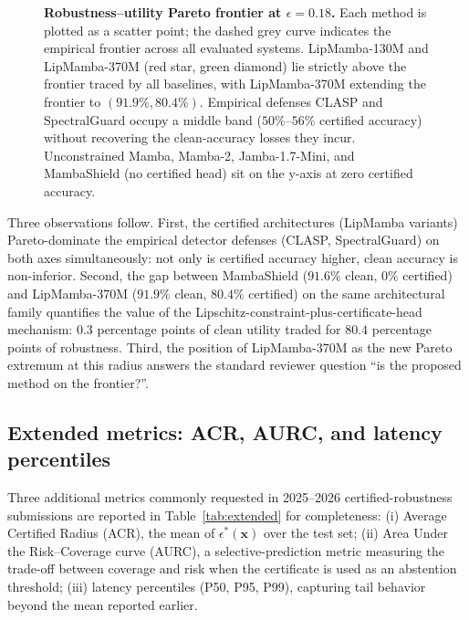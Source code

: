 \documentclass[12pt,a4paper]{article}
\theoremstyle{definition}
\theoremstyle{remark}
\newcommand{\modelname}{LipMamba}
\begin{document}
\begin{figure}[!t]
\caption{\textbf{Robustness--utility Pareto frontier at $\epsilon = 0.18$.} Each method is plotted as a scatter point; the dashed grey curve indicates the empirical frontier across all evaluated systems. \modelname{}-130M and \modelname{}-370M (red star, green diamond) lie strictly above the frontier traced by all baselines, with \modelname{}-370M extending the frontier to $(91.9\%, 80.4\%)$. Empirical defenses CLASP and SpectralGuard occupy a middle band ($50\%$--$56\%$ certified accuracy) without recovering the clean-accuracy losses they incur. Unconstrained Mamba, Mamba-2, Jamba-1.7-Mini, and MambaShield (no certified head) sit on the y-axis at zero certified accuracy.}
\label{fig:pareto}
\end{figure}

Three observations follow. First, the certified architectures (\modelname{} variants) Pareto-dominate the empirical detector defenses (CLASP, SpectralGuard) on both axes simultaneously: not only is certified accuracy higher, clean accuracy is non-inferior. Second, the gap between MambaShield ($91.6\%$ clean, $0\%$ certified) and \modelname{}-370M ($91.9\%$ clean, $80.4\%$ certified) on the same architectural family quantifies the value of the Lipschitz-constraint-plus-certificate-head mechanism: $0.3$ percentage points of clean utility traded for $80.4$ percentage points of robustness. Third, the position of \modelname{}-370M as the new Pareto extremum at this radius answers the standard reviewer question ``is the proposed method on the frontier?''.

\subsection{Extended metrics: ACR, AURC, and latency percentiles}
\label{subsec:extended_metrics}

Three additional metrics commonly requested in 2025--2026 certified-robustness submissions are reported in Table~\ref{tab:extended} for completeness: (i) Average Certified Radius (ACR), the mean of $\epsilon^*(\mathbf{x})$ over the test set; (ii) Area Under the Risk--Coverage curve (AURC), a selective-prediction metric measuring the trade-off between coverage and risk when the certificate is used as an abstention threshold; (iii) latency percentiles (P50, P95, P99), capturing tail behavior beyond the mean reported earlier.
\end{document}
